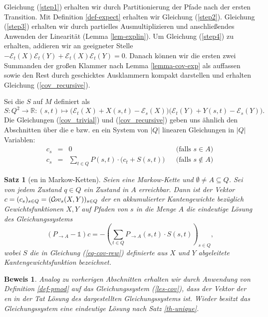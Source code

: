 \documentclass[a4paper]{article}
\newcommand{\mc}{Markow-Kette}
\newtheorem{satz}{Satz}[section] %
\theoremstyle{nonumberplain}
\newtheorem{beweis}{Beweis}
\begin{document}
	Gleichung (\ref{step1}) erhalten wir durch Partitionierung der Pfade nach der ersten Transition.
	Mit Definition \ref{def-expect} erhalten wir Gleichung (\ref{step2}).
	Gleichung (\ref{step3}) erhalten wir durch partielles Ausmultiplizieren und anschließendes Anwenden der Linearität (Lemma \ref{lem-explin}). Um Gleichung (\ref{step4}) zu erhalten, addieren wir an geeigneter Stelle $- \mathcal{E}_{t}(X)\mathcal{E}_{t}(Y) + \mathcal{E}_{t}(X)\mathcal{E}_{t}(Y) = 0$. Danach können wir die ersten zwei Summanden der großen Klammer nach Lemma \ref{lemma-cov-exp} als \cov{} auffassen sowie den Rest durch geschicktes Ausklammern kompakt darstellen und erhalten Gleichung (\ref{cov_recursive}).
	
	Sei die \reward{} $S$ auf $M$ definiert als
	\begin{equation}
	S: Q^2 \to \mathbb{R} : (s,t) \mapsto \big(\mathcal{E}_{t}(X) + X(s,t) - \mathcal{E}_{s}(X)\big)\big(\mathcal{E}_{t}(Y) + Y(s,t) - \mathcal{E}_{s}(Y)\big)\text{.} \label{eq-cov-rew}
	\end{equation}
	Die Gleichungen (\ref{cov_trivial}) und (\ref{cov_recursive}) geben uns ähnlich den Abschnitten über die \expect{}e bzw. \cov{}en ein System von $|Q|$ linearen Gleichungen in $|Q|$ Variablen:
	\begin{equation}
	\begin{aligned}
	c_s & = & 0 && \text{(falls $s \in A$)}\\
	c_s & = & \sum_{t \in Q}P(s,t) \cdot \big(c_t + S(s,t)\big) && \text{(falls $s \notin A$)} 
	\end{aligned} \label{les-cov}
	\end{equation}
	\begin{satz}[\cov{}en in \mc{}n] \label{th-cov}
		\quad Seien \mcex{} eine \mc{} und $\emptyset \neq A\subseteq Q$. Sei von jedem Zustand $q\in Q$ ein Zustand in $A$ erreichbar. Dann ist der Vektor $c = (c_s)_{s \in Q } = (\mathcal{C}\!ov_{s}(X,Y))_{s \in Q }$ der \cov{}en akkumulierter Kantengewichte bezüglich Gewichtsfunktionen $X,Y$ auf Pfaden von $s$ in die Menge $A$ die eindeutige Lösung des Gleichungssystems
		\begin{equation}
		(P_{\rightarrow A} - \mathbb{1}) c = - \left(\sum_{t \in Q}{ P_{\rightarrow A}(s,t) \cdot S(s,t) }\right)_{s \in Q} \text{,}\label{les-cov-mat}
		\end{equation}
		wobei $S$ die in Gleichung (\ref{eq-cov-rew}) definierte aus $X$ und $Y$ abgeleitete Kantengewichtsfunktion bezeichnet.
	\end{satz}
	\begin{beweis}
		Analog zu vorherigen Abschnitten erhalten wir durch Anwendung von Definition \ref{def-pmod} auf das Gleichungssystem (\ref{les-cov}), dass der Vektor der \cov{}en in der Tat Lösung des dargestellten Gleichungssystems ist. Wieder besitzt das Gleichungssystem eine eindeutige Lösung nach Satz \ref{th-unique}.
	\end{beweis}
	
\end{document}
